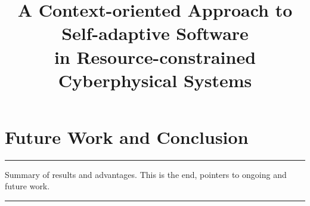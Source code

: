\documentclass[10pt, conference, compsocconf]{IEEEtran}
\begin{document}
\title{A Context-oriented Approach to Self-adaptive Software\\ in Resource-constrained Cyberphysical Systems}


\author{}


\maketitle










\section{Future Work and Conclusion}
\label{sec:ending}

\hrule
Summary of results and advantages. This is the end, pointers to ongoing and future work.
\hrule


{\small
}
\end{document}
